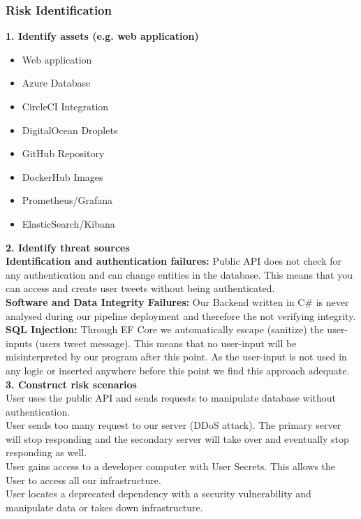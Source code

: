 
\subsubsection*{Risk Identification}
\textbf{1. Identify assets (e.g. web application)}
\begin{itemize}
    \item Web application
    \item Azure Database
    \item CircleCI Integration
    \item DigitalOcean Droplets
    \item GitHub Repository
    \item DockerHub Images
    \item Prometheus/Grafana
    \item ElasticSearch/Kibana
\end{itemize}
\textbf{2. Identify threat sources}\\
\vspace{5mm} %
\textbf{Identification and authentication failures:} Public API does not check for any authentication and can change entities in the database. This means that you can access and create user tweets without being authenticated.
\vspace{5mm} %
\\
\textbf{Software and Data Integrity Failures:} Our Backend written in C\# is never analysed during our pipeline deployment and therefore the not verifying integrity.
\vspace{5mm} %
\\
\textbf{SQL Injection:} Through EF Core we automatically escape (sanitize) the user-inputs (users tweet message). This means that no user-input will be misinterpreted by our program after this point. As the user-input is not used in any logic or inserted anywhere before this point we find this approach adequate.
\vspace{5mm} %
\\
\textbf{3. Construct risk scenarios}
\\
User uses the public API and sends requests to manipulate database without authentication.
\\
User sends too many request to our server (DDoS attack). The primary server will stop responding and the secondary server will take over and eventually stop responding as well.
\\
User gains access to a developer computer with User Secrets. This allows the User to access all our infrastructure.
\\
User locates a deprecated dependency with a security vulnerability and manipulate data or takes down infrastructure.
